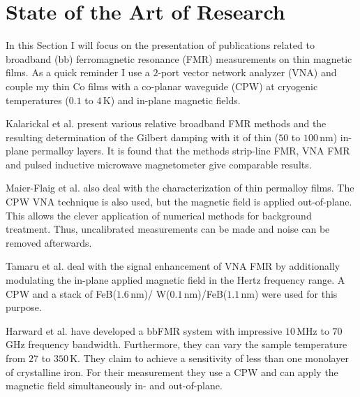 \section{State of the Art of Research}
In this Section I will focus on the presentation of publications related to broadband (bb) ferromagnetic resonance (FMR) measurements on thin magnetic films. As a quick reminder I use a $2$-port vector network analyzer (VNA) and couple my thin Co films with a co-planar waveguide (CPW) at cryogenic temperatures ($0.1$ to $4\,$K) and in-plane magnetic fields.

Kalarickal et al. present various relative broadband FMR methods and the resulting determination of the Gilbert damping with it of thin ($50$ to $100\,$nm) in-plane permalloy layers. It is found that the methods strip-line FMR, VNA FMR and pulsed inductive microwave magnetometer give comparable results. \cite{Kalarickal2006}

Maier-Flaig et al. also deal with the characterization of thin permalloy films. The CPW VNA technique is also used, but the magnetic field is applied out-of-plane. This allows the clever application of numerical methods for background treatment. Thus, uncalibrated measurements can be made and noise can be removed afterwards. \cite{maierflaig2018,maierflaig2017}

Tamaru et al. deal with the signal enhancement of VNA FMR by additionally modulating the in-plane applied magnetic field in the Hertz frequency range. A CPW and a stack of FeB($1.6\,$nm)/ W($0.1\,$nm)/FeB($1.1\,$nm) were used for this purpose. \cite{Tamaru2018}


Harward et al. have developed a bbFMR system with impressive $10\,$MHz to $70\,$GHz frequency bandwidth. Furthermore, they can vary the sample temperature from $27$ to $350\,$K. They claim to achieve a sensitivity of less than one monolayer of crystalline iron. For their measurement they use a CPW and can apply the magnetic field simultaneously in- and out-of-plane. \cite{Harward2011}

